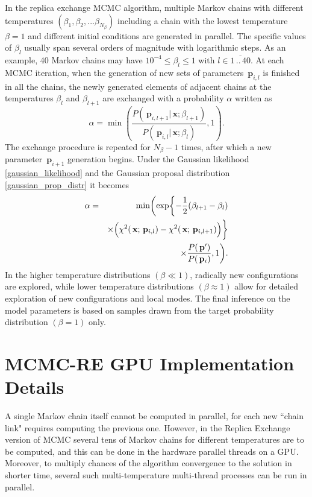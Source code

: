 \documentclass[preprint2]{aastex}
\newcommand{\bfp}{\,\mathbf{p}}
\newcommand{\bfx}{\,\mathbf{x}}
\begin{document}
In the replica exchange MCMC algorithm, multiple Markov chains with different temperatures $(\beta_1,\beta_2, ... \beta_{N_\beta})$ including a chain with the lowest temperature $\beta=1$ and different initial conditions are generated in parallel. The specific values of $\beta_l$ usually span several orders of magnitude with logarithmic steps. As an example, 40 Markov chains may have $10^{-4} \leqslant \beta_l \leqslant 1$ with $l \in \overline{1\,..\,40}$. At each MCMC iteration, when the generation of new sets of parameters $\bfp_{i,l}$ is finished in all the chains, the newly generated elements of adjacent chains at the temperatures $\beta_l$ and $\beta_{l+1}$ are exchanged with a probability $\alpha$ written as
\begin{equation}
  \label{exchange_probab}
  \alpha =  \min \left( \frac{P(\bfp_{i,l+1}|\bfx; \beta_{l+1})} 
            {P(\bfp_{i,l}|\bfx; \beta_{l})}, 1 \right) .
\end{equation}
The exchange procedure is repeated for $N_\beta - 1$ times, after which a new parameter $\bfp_{i+1}$ generation begins. Under the Gaussian  likelihood \eqref{gaussian_likelihood} and the Gaussian proposal distribution \eqref{gaussian_prop_distr} it becomes
\begin{eqnarray}
  \label{accept_probab_beta2}
  \alpha &=& \min \biggl( \exp \biggl\lbrace -\frac{1}{2}(\beta_{l+1} - \beta_{l}) \nonumber \\
         &&\times  \Bigl( \chi^2(\bfx;\bfp_{i,l}) -
                 \chi^2(\bfx;\bfp_{i,l+1}) \Bigr) \biggr\rbrace  \nonumber \\
         &&\times \frac{P(\bfp')}{P(\bfp_i)}, 1 \biggr)      .
\end{eqnarray}
In the higher temperature distributions $(\beta \ll 1)$, radically new configurations are explored, while lower temperature distributions  $(\beta \approx 1)$ allow for detailed exploration of new configurations and local modes. The final inference on the model parameters is based on samples drawn from the target probability distribution $(\beta=1)$ only.




\section{MCMC-RE GPU Implementation Details}

A single Markov chain itself cannot be computed in parallel, for each new ``chain link"
requires computing the previous one. However, in the Replica Exchange
version of MCMC several tens of Markov chains for different temperatures
are to be computed, and this can be done in the hardware parallel threads
on a GPU. Moreover, to multiply chances of the algorithm convergence
to the solution in shorter time, several such multi-temperature multi-thread 
processes can be run in parallel.
\end{document}
